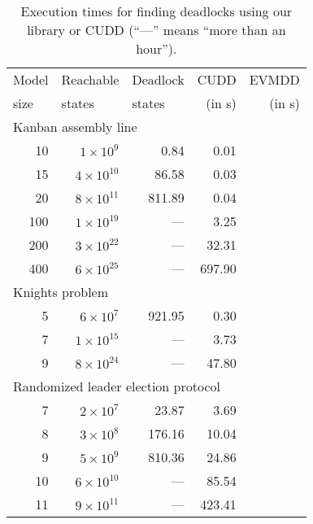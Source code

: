 \documentclass[nocover]             %
{NASA}                       %
\begin{document}
{\begin{table}[htb]
\begin{center}
    \begin{tabular}{|r||r|r||r|r|}
      \hline
      \multicolumn{1}{|l||}{Model} & \multicolumn{1}{l|}{Reachable} & \multicolumn{1}{|l||}{Deadlock} & CUDD & EVMDD \\
      \multicolumn{1}{|l||}{size}  & \multicolumn{1}{l|}{states} & \multicolumn{1}{|l||}{states} & (in s) & (in s) \\
      \hline
      \multicolumn{4}{|l|}{Kanban assembly line}\\
      \hline
      10 & $1\times10^{9}$ &    0.84 &    0.01 \\
      15 & $4\times10^{10}$ &   86.58 &    0.03 \\
      20 & $8\times10^{11}$ &  811.89 &    0.04 \\
      100 & $1\times10^{19}$ &   --- &    3.25 \\
      200 & $3\times10^{22}$ &   --- &   32.31 \\
      400 & $6\times10^{25}$ &   --- &  697.90 \\
      \hline
      \multicolumn{4}{|l|}{Knights problem}\\
      \hline
      5 & $6\times10^{7}$ &  921.95 &    0.30 \\
      7 & $1\times10^{15}$ &   --- &    3.73 \\
      9 & $8\times10^{24}$ &   --- &   47.80 \\
      \hline
      \multicolumn{4}{|l|}{Randomized leader election protocol}\\
      \hline
      7 & $2\times10^{7}$   &   23.87 &    3.69 \\
      8 & $3\times10^{8}$   &  176.16 &   10.04 \\
      9 & $5\times10^{9}$   &  810.36 &   24.86 \\
      10 & $6\times10^{10}$ &    ---  &   85.54 \\
      11 & $9\times10^{11}$ &    ---  &  423.41 \\
      \hline
    \end{tabular}
\vspace*{3mm}
    \caption{Execution times for finding deadlocks using our library or CUDD (``---'' means ``more than an hour'').}
    \label{table-results}
  \end{center}
\end{table}
}
\end{document}
